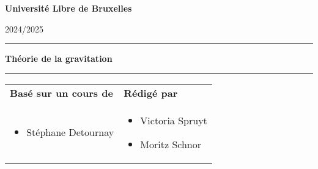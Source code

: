 \documentclass[a4paper,12pt]{report} %
\begin{document}
\begin{titlepage}
\begin{center}

{\bf {\large Université Libre de Bruxelles}}\\\vspace{0.8cm}
\begin{center}
2024/2025
\end{center}
\vspace{3cm}

\vspace{1.5cm}
\noindent\rule{\textwidth}{1mm}
\Large{\textbf{Théorie de la gravitation}}
\noindent\rule{\textwidth}{1mm}
\end{center}
\vspace{3cm}
\begin{tabular}{ p{9cm}  p{6cm} }
\textbf{Basé sur un cours de} & \textbf{Rédigé par} \\
\begin{itemize}
    \item Stéphane Detournay
\end{itemize}
&
\begin{itemize}
    \item Victoria Spruyt
    \item Moritz Schnor
\end{itemize}
\\
\end{tabular}
\\
\,\vspace{3cm}

\end{titlepage}

\tableofcontents
\newpage















%
\end{document}
